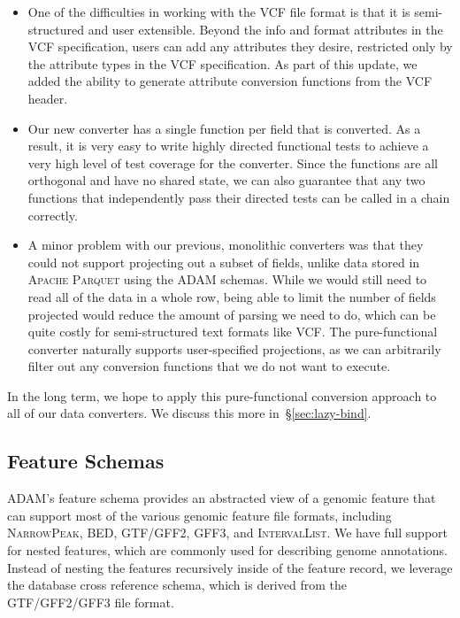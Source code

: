 \documentclass[phd]{ucbthesis}
\begin{document}
\begin{itemize}
\item One of the difficulties in working with the VCF file format is that it is
  semi-structured and user extensible. Beyond the info and format attributes
  in the VCF specification, users can add any attributes they desire, restricted
  only by the attribute types in the VCF specification. As part of this update,
  we added the ability to generate attribute conversion functions from the VCF
  header.
\item Our new converter has a single function per field that is converted. As a
  result, it is very easy to write highly directed functional tests to achieve a
  very high level of test coverage for the converter. Since the functions are
  all orthogonal and have no shared state, we can also guarantee that any two
  functions that independently pass their directed tests can be called in a
  chain correctly.
\item A minor problem with our previous, monolithic converters was that they
  could not support projecting out a subset of fields, unlike data stored in
  \textsc{Apache Parquet} using the \textsc{ADAM} schemas. While we would
  still need to read all of the data in a whole row, being able to limit the
  number of fields projected would reduce the amount of parsing we need to do,
  which can be quite costly for semi-structured text formats like VCF. The
  pure-functional converter naturally supports user-specified projections, as we
  can arbitrarily filter out any conversion functions that we do not want to
  execute.
\end{itemize}

In the long term, we hope to apply this pure-functional conversion approach to
all of our data converters. We discuss this more in~\S\ref{sec:lazy-bind}.

\subsection{Feature Schemas}
\label{sec:feature-schemas}

\textsc{ADAM}'s feature schema provides an abstracted view of a genomic feature
that can support most of the various genomic feature file formats, including
\textsc{NarrowPeak}, BED, GTF/GFF2, GFF3, and \textsc{IntervalList}. We have
full support for nested features, which are commonly used for describing genome
annotations. Instead of nesting the features recursively inside of the feature
record, we leverage the database cross reference schema, which is derived from
the GTF/GFF2/GFF3 file format.
\end{document}
